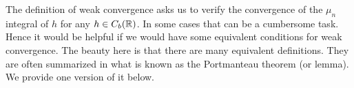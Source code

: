 The definition of weak convergence asks us to verify the convergence of the $\mu_n$ integral of $h$ for any $h\in C_b(\mathbb R)$. In some cases that can be a cumbersome task. Hence it would be helpful if we would have some equivalent conditions for weak convergence. The beauty here is that there are many equivalent definitions. They are often summarized in what is known as the Portmanteau theorem (or lemma). We provide one version of it below.


%
%
